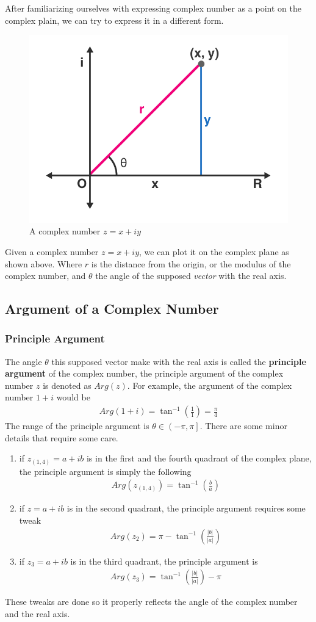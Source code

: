 \documentclass[12pt]{book}
\newcommand{\paren}[1]{\left( #1 \right)}
\newcommand{\openclose}[1]{\left( #1 \right]}
\begin{document}
After familiarizing ourselves with expressing complex number as a point on the complex plain, we can try to express it in a different form. 
\begin{figure}[!h]
    \centering
    \includegraphics[width=0.5\linewidth]{pictures/pic1.3.1.png}
    \caption{A complex number $z = x+iy$}
    \label{fig:1.3}
\end{figure}
Given a complex number $z = x+iy$, we can plot it on the complex plane as shown above. Where $r$ is the distance from the origin, or the modulus of the complex number, and $\theta$ the angle of the supposed \textit{vector} with the real axis. 

\subsection{Argument of a Complex Number}
\subsubsection{Principle Argument}
The angle $\theta$ this supposed vector make with the real axis is called the \textbf{principle argument} of the complex number, the principle argument of the complex number $z$ is denoted as $Arg(z)$. For example, the argument of the complex number $1+i$ would be 
\begin{align}
    Arg(1+i) = \tan^{-1}\paren{\frac{1}{1}} = \frac{\pi}{4}
\end{align}
The range of the principle argument is $\theta \in \openclose{-\pi,\pi}$. There are some minor details that require some care.
\begin{enumerate}
    \item if $z_{(1,4)}=a+ib$ is in the first and the fourth quadrant of the complex plane, the principle argument is simply the following
    \begin{align}
        Arg(z_{(1,4)}) = \tan^{-1}\paren{\frac{b}{a}}
    \end{align}
    \item if $z = a+ib$ is in the second quadrant, the principle argument requires some tweak
    \begin{align}
        Arg\paren{z_2} = \pi - \tan^{-1}\paren{\frac{|b|}{|a|}}
    \end{align}
    \item if $z_3=a+ib$ is in the third quadrant, the principle argument is
    \begin{align}
        Arg(z_3) = \tan^{-1}\paren{\frac{|b|}{|a|}} - \pi
    \end{align}
\end{enumerate}
These tweaks are done so it properly reflects the angle of the complex number and the real axis. 
\newpage
\end{document}
